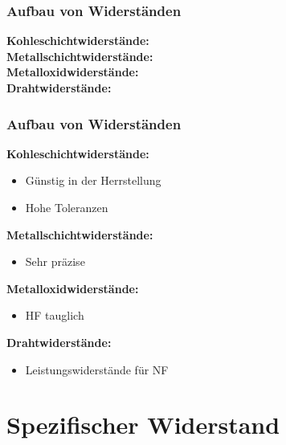 \begin{frame}
	\frametitle{Aufbau von Widerständen}
	\textbf{Kohleschichtwiderstände:}\\
	\vspace{1cm}
	\textbf{Metallschichtwiderstände:}\\
	\vspace{5mm}
	\textbf{Metalloxidwiderstände:}\\
	\vspace{5mm}
	\textbf{Drahtwiderstände:}
\end{frame}

\begin{frame}
	\frametitle{Aufbau von Widerständen}
	\textbf{Kohleschichtwiderstände:}
	\begin{itemize}
		\item Günstig in der Herrstellung
		\item Hohe Toleranzen
	\end{itemize}
	\textbf{Metallschichtwiderstände:}
	\begin{itemize}
		\item Sehr präzise
	\end{itemize}
	\textbf{Metalloxidwiderstände:}
	\begin{itemize}
		\item HF tauglich
	\end{itemize}
	\textbf{Drahtwiderstände:}
	\begin{itemize}
		\item Leistungswiderstände für NF
	\end{itemize}
\end{frame}

\section{Spezifischer Widerstand}

